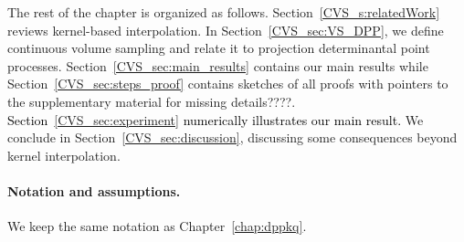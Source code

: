 \documentclass[twoside,11pt]{book}
\newcommand{\rev}[1]{\textcolor{black}{#1}}
\numberwithin{theorem}{chapter}
\numberwithin{definition}{chapter}
\numberwithin{proposition}{chapter}
\numberwithin{corollary}{chapter}
\numberwithin{example}{chapter}
\numberwithin{lemma}{chapter}
\numberwithin{assumption}{chapter}
\numberwithin{equation}{chapter}
\numberwithin{figure}{chapter}
\begin{document}

The rest of the chapter is organized as follows. Section~\ref{CVS_s:relatedWork} reviews kernel-based interpolation. In Section~\ref{CVS_sec:VS_DPP}, we define continuous volume sampling and relate it to projection determinantal point processes. Section~\ref{CVS_sec:main_results} contains our main results while Section~\ref{CVS_sec:steps_proof} contains sketches of all proofs with pointers to the supplementary material for missing details????. \rev{Section~\ref{CVS_sec:experiment} numerically illustrates our main result.} We conclude in Section~\ref{CVS_sec:discussion}, discussing some consequences beyond kernel interpolation.

\paragraph{Notation and assumptions.}\label{CVS_paragraph:notation}
We keep the same notation as Chapter~\ref{chap:dppkq}. 
%
\end{document}
